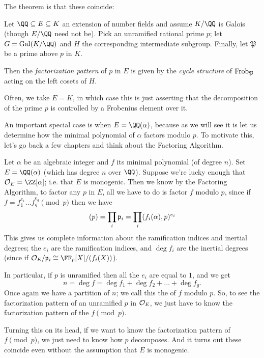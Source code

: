 The theorem is that these coincide:
\begin{theorem}
	\label{thm:frob_control_decomp}
	Let $\QQ \subseteq E \subseteq K$ an extension of number fields
	and assume $K/\QQ$ is Galois (though $E/\QQ$ need not be).
	Pick an unramified rational prime $p$; let $G = \Gal(K/\QQ)$
	and $H$ the corresponding intermediate subgroup.
	Finally, let $\mathfrak P$ be a prime above $p$ in $K$.

	Then the \emph{factorization pattern} of $p$ in $E$ is given by
	the \emph{cycle structure} of $\mathrm{Frob}_{\mathfrak P}$ acting on the left cosets of $H$.
\end{theorem}
Often, we take $E = K$, in which case this is just asserting
that the decomposition of the prime $p$ is controlled by a Frobenius element over it.

An important special case is when $E = \QQ(\alpha)$,
because as we will see it is let us determine how the minimal
polynomial of $\alpha$ factors modulo $p$.
To motivate this, let's go back a few chapters
and think about the Factoring Algorithm.

Let $\alpha$ be an algebraic integer and $f$ its minimal polynomial (of degree $n$).
Set $E = \QQ(\alpha)$ (which has degree $n$ over $\QQ$).
Suppose we're lucky enough that $\OO_E = \ZZ[\alpha]$;
i.e. that $E$ is monogenic.
Then we know by the Factoring Algorithm,
to factor any $p$ in $E$, all we have to do is factor $f$ modulo $p$,
since if $f = f_1^{e_1} \dots f_g^{e_g} \pmod p$ then we have
\[ (p) = \prod_i \mathfrak p_i = \prod_i (f_i(\alpha), p)^{e_i} \]
This gives us complete information about the ramification indices and inertial degrees;
the $e_i$ are the ramification indices, and $\deg f_i$ are the inertial degrees
(since if $\OO_E / \pp_i \cong \FF_p[X] / (f_i(X))$).

In particular, if $p$ is unramified then all the $e_i$ are equal to $1$, and we get
\[ n = \deg f = \deg f_1 + \deg f_2 + \dots + \deg f_g. \]
Once again we have a partition of $n$;
we call this the  of $f$ modulo $p$.
So, to see the factorization pattern of an unramified $p$ in $\mathcal O_E$,
we just have to know the factorization pattern of the $f \pmod p$.

Turning this on its head, if we want to know the factorization pattern of $f \pmod p$,
we just need to know how $p$ decomposes.
And it turns out these coincide even without the assumption that $E$ is monogenic.

